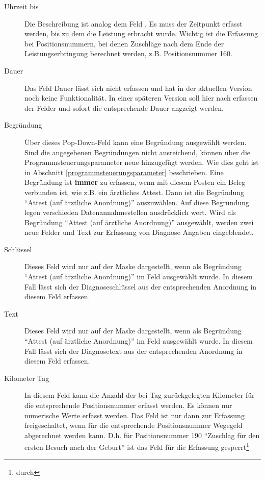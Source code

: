 \begin{description}
\item[Uhrzeit bis]
Die Beschreibung ist analog dem Feld . Es muss der
Zeitpunkt erfasst werden, bis zu dem die Leistung erbracht wurde.
Wichtig ist die Erfassung bei Positionsnummern, bei denen Zuschläge nach dem
Ende der Leistungserbringung berechnet werden, z.B. Positionsnummer 160.
\item[Dauer]
Das Feld Dauer lässt sich nicht erfassen und hat in der aktuellen Version
noch keine Funktionalität. In einer späteren Version soll hier nach erfassen
der Felder  und  sofort die entsprechende
Dauer angzeigt werden.
\item[Begründung]
Über dieses Pop-Down-Feld kann eine Begründung ausgewählt werden. Sind
die angegebenen Begründungen nicht ausreichend, können über die
Programmsteuerungsparameter neue hinzugefügt werden. Wie dies geht ist 
in Abschnitt \vref{programmsteuerungsparameter} beschrieben. 
Eine Begründung ist \textbf{immer} zu erfassen,
wenn mit diesem Posten ein Beleg verbunden ist, wie z.B. ein 
ärztliches Attest. Dann ist die Begründung ``Attest (auf ärztliche
Anordnung)'' auszuwählen. Auf diese Begründung legen verschieden 
Datenannahmestellen ausdrücklich wert. Wird als Begründung ``Attest
(auf ärztliche Anordnung)'' ausgewählt, werden zwei neue Felder
 und {Text} zur Erfassung von Diagnose Angaben 
eingeblendet.
\item[Schlüssel]
Dieses Feld wird nur auf der Maske dargestellt, wenn als Begründung
``Attest (auf ärztliche Anordnung)'' im Feld 
ausgewählt wurde. In diesem Fall lässt sich der Diagnoseschlüssel
 aus der entsprechenden Anordnung
in diesem Feld erfassen.
\item[Text]
Dieses Feld wird nur auf der Maske dargestellt, wenn als Begründung
``Attest (auf ärztliche Anordnung)'' im Feld 
ausgewählt wurde. In diesem Fall lässt sich der Diagnosetext
 aus der entsprechenden Anordnung
in diesem Feld erfassen.
\item[Kilometer Tag]
In diesem Feld kann die Anzahl der bei Tag zurückgelegten Kilometer für die
entsprechende Positionsnummer erfasst werden. Es können nur numerische
Werte erfasst werden. Das Feld ist nur dann zur Erfassung freigeschaltet,
wenn für die entsprechende Positionsnummer Wegegeld abgerechnet werden
kann. D.h. für Positionsnummer 190 ``Zuschlag für den ersten Besuch nach
der Geburt'' ist das Feld für die Erfassung gesperrt\footnote{durch
}
\end{description}
